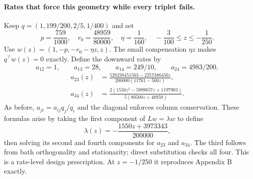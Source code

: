 \paragraph{Rates that force this geometry while every triplet fails.}
Keep $q=(1,199/200,2/5,1/400)$ and set
\[
p=\frac{759}{1000},\quad r_0=\frac{48959}{80000},\quad
\eta=\frac1{160},\quad -\frac3{100}\leq z\leq-\frac1{250}.
\]
Use $w(z)=(1,-p,-r_0-\eta z,z)$. The small compensation $\eta z$ makes $q^\top w(z)=0$ exactly. Define the downward rates by
\[
a_{12}=1,\qquad a_{13}=28,\qquad a_{14}=249/10,\qquad a_{24}=4983/200,
\]
\begin{align*}
a_{23}(z)&=\frac{528238451563-2257386450z}{200000(11761-500z)},\\
a_{34}(z)&=\frac{2(1550z^2-5989657z+1197903)}{5(80500z+48959)}.
\end{align*}
As before, $a_{ji}=a_{ij}q_j/q_i$ and the diagonal enforces column conservation. These formulas arise by taking the first component of $Lw=\lambda w$ to define
\[
\lambda(z)=-\frac{1550z+3973343}{200000},
\]
then solving its second and fourth components for $a_{23}$ and $a_{34}$. The third follows from bath orthogonality and stationarity; direct substitution checks all four. This is a rate-level design prescription. At $z=-1/250$ it reproduces Appendix B exactly.

